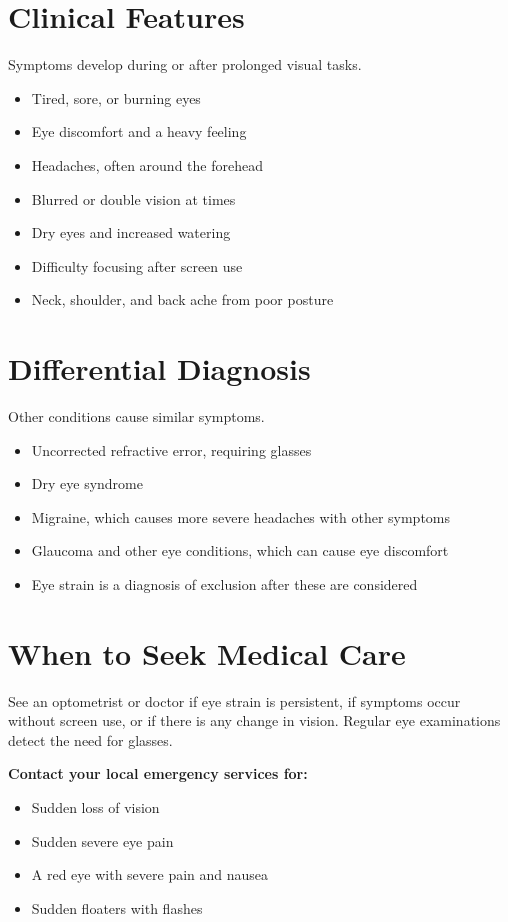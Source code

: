 \section*{Clinical Features}
Symptoms develop during or after prolonged visual tasks.
\begin{itemize}
    \item Tired, sore, or burning eyes
    \item Eye discomfort and a heavy feeling
    \item Headaches, often around the forehead
    \item Blurred or double vision at times
    \item Dry eyes and increased watering
    \item Difficulty focusing after screen use
    \item Neck, shoulder, and back ache from poor posture
\end{itemize}

\section*{Differential Diagnosis}
Other conditions cause similar symptoms.
\begin{itemize}
    \item Uncorrected refractive error, requiring glasses
    \item Dry eye syndrome
    \item Migraine, which causes more severe headaches with other symptoms
    \item Glaucoma and other eye conditions, which can cause eye discomfort
    \item Eye strain is a diagnosis of exclusion after these are considered
\end{itemize}

\section*{When to Seek Medical Care}
See an optometrist or doctor if eye strain is persistent, if symptoms occur without screen use, or if there is any change in vision. Regular eye examinations detect the need for glasses.

\textbf{Contact your local emergency services for:}
\begin{itemize}
    \item Sudden loss of vision
    \item Sudden severe eye pain
    \item A red eye with severe pain and nausea
    \item Sudden floaters with flashes
\end{itemize}

